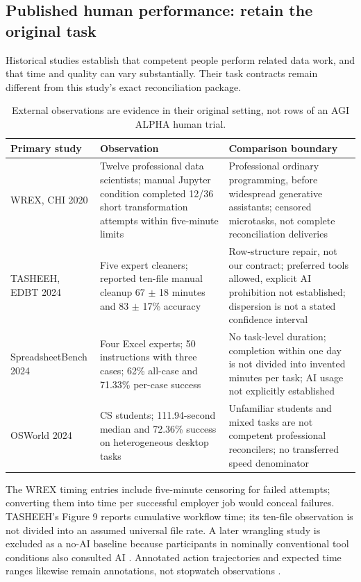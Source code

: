 \documentclass[11pt,a4paper]{article}
\newcommand{\smalltable}{\small\setlength{\tabcolsep}{5pt}}
\begin{document}
\subsection{Published human performance: retain the original task}

Historical studies establish that competent people perform related data work, and that time and quality can vary substantially. Their task contracts remain different from this study's exact reconciliation package.

\begin{table}[H]\centering\smalltable
\begin{tabularx}{\linewidth}{P{.19\linewidth}YY}
\toprule
Primary study & Observation & Comparison boundary\\
\midrule
WREX, CHI 2020 \citep{drosos2020wrex} & Twelve professional data scientists; manual Jupyter condition completed 12/36 short transformation attempts within five-minute limits & Professional ordinary programming, before widespread generative assistants; censored microtasks, not complete reconciliation deliveries\\
TASHEEH, EDBT 2024 \citep{hameed2024tasheeh} & Five expert cleaners; reported ten-file manual cleanup 67 $\pm$ 18 minutes and 83 $\pm$ 17\% accuracy & Row-structure repair, not our contract; preferred tools allowed, explicit AI prohibition not established; dispersion is not a stated confidence interval\\
SpreadsheetBench 2024 \citep{ma2024spreadsheetbench} & Four Excel experts; 50 instructions with three cases; 62\% all-case and 71.33\% per-case success & No task-level duration; completion within one day is not divided into invented minutes per task; AI usage not explicitly established\\
OSWorld 2024 \citep{xie2024osworld} & CS students; 111.94-second median and 72.36\% success on heterogeneous desktop tasks & Unfamiliar students and mixed tasks are not competent professional reconcilers; no transferred speed denominator\\
\bottomrule
\end{tabularx}
\caption{External observations are evidence in their original setting, not rows of an AGI ALPHA human trial.}
\end{table}

The WREX timing entries include five-minute censoring for failed attempts; converting them into time per successful employer job would conceal failures. TASHEEH's Figure 9 reports cumulative workflow time; its ten-file observation is not divided into an assumed universal file rate. A later wrangling study is excluded as a no-AI baseline because participants in nominally conventional tool conditions also consulted AI \citep{he2026wrangling}. Annotated action trajectories and expected time ranges likewise remain annotations, not stopwatch observations \citep{abhyankar2026osworldhuman,yuan2026osworld2}.
\end{document}
